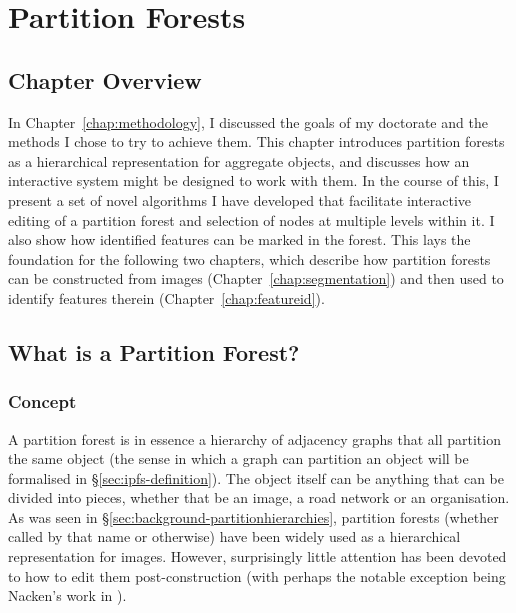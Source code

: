 \chapter{Partition Forests}
\label{chap:ipfs}

\section{Chapter Overview}

In Chapter~\ref{chap:methodology}, I discussed the goals of my doctorate and the methods I chose to try to achieve them. This chapter introduces partition forests as a hierarchical representation for aggregate objects, and discusses how an interactive system might be designed to work with them. In the course of this, I present a set of novel algorithms I have developed that facilitate interactive editing of a partition forest and selection of nodes at multiple levels within it. I also show how identified features can be marked in the forest. This lays the foundation for the following two chapters, which describe how partition forests can be constructed from images (Chapter~\ref{chap:segmentation}) and then used to identify features therein (Chapter~\ref{chap:featureid}).

\section{What is a Partition Forest?}

\subsection{Concept}

A partition forest is in essence a hierarchy of adjacency graphs that all partition the same object (the sense in which a graph can partition an object will be formalised in \S\ref{sec:ipfs-definition}). The object itself can be anything that can be divided into pieces, whether that be an image, a road network or an organisation. As was seen in \S\ref{sec:background-partitionhierarchies}, partition forests (whether called by that name or otherwise) have been widely used as a hierarchical representation for images. However, surprisingly little attention has been devoted to how to edit them post-construction (with perhaps the notable exception being Nacken's work in \cite{nacken95}).


